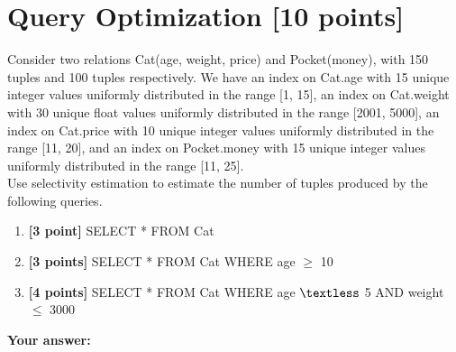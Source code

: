 \documentclass[10pt]{article}
\begin{document}
\section{Query Optimization \textbf{[10 points]}}
Consider two relations Cat(age, weight, price) and Pocket(money), with 150 tuples and 100 tuples respectively.
We have an index on Cat.age with 15 unique integer values uniformly distributed in the range [1, 15],
an index on Cat.weight with 30 unique float values uniformly distributed in the range [2001, 5000],
an index on Cat.price with 10 unique integer values uniformly distributed in the range [11, 20],
and an index on Pocket.money with 15 unique integer values uniformly distributed in the range [11, 25]. \\
Use selectivity estimation to estimate the number of tuples produced by the following queries.
\begin{enumerate}
	\item \textbf{[3 point]} SELECT * FROM Cat\\
	\item \textbf{[3 points]} SELECT * FROM Cat WHERE age $\geq$ 10\\
	\item \textbf{[4 points]} SELECT * FROM Cat WHERE age $\textless$ 5 AND weight $\leq$ 3000\\
\end{enumerate}
\textbf{Your answer:}
\end{document}
